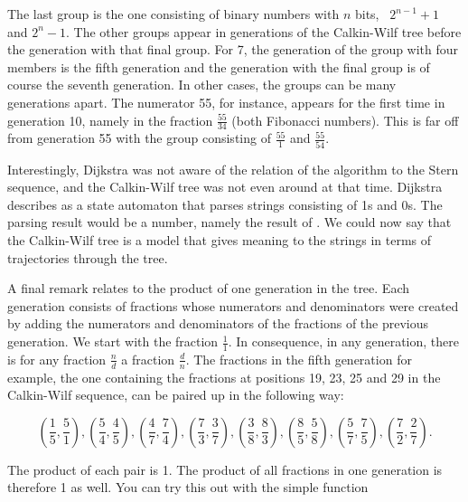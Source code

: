 \documentclass[tikz]{scrreprt}
\newcommand{\texfamily}{\fontfamily{cmtex}\selectfont}
\begin{document}

The last group is the one consisting of
binary numbers with $n$ bits, \ie\ $2^{n-1}+1$ and $2^n-1$.
The other groups appear in generations of the Calkin-Wilf tree
before the generation with that final group.
For 7, the generation of the group
with four members is the fifth generation and
the generation with the final group is of course the seventh generation.
In other cases,
the groups can be many generations apart.
The numerator 55, for instance, appears for the first time
in generation 10, namely in the fraction $\frac{55}{34}$
(both Fibonacci numbers).
This is far off from generation 55 
with the group consisting of $\frac{55}{1}$ and $\frac{55}{54}$.

Interestingly, Dijkstra was not aware of the relation
of the \text{\texfamily fusc} algorithm to the Stern sequence, and
the Calkin-Wilf tree was not even around at that time.
Dijkstra describes \text{\texfamily fusc} as a state automaton that
parses strings consisting of 1s and 0s.
The parsing result would be a number, 
namely the result of \text{\texfamily fusc}.
We could now say that the Calkin-Wilf tree
is a model that gives meaning to the strings
in terms of trajectories through the tree.

A final remark relates to the product of one generation in the tree.
Each generation consists of fractions 
whose numerators and denominators were created
by adding the numerators and denominators 
of the fractions of the previous generation.
We start with the fraction $\frac{1}{1}$.
In consequence, in any generation, 
there is for any fraction $\frac{n}{d}$ 
a fraction $\frac{d}{n}$.
The fractions in the fifth generation for example,
the one containing the fractions 
at positions 19, 23, 25 and 29 in the Calkin-Wilf sequence,
can be paired up in the following way:

\[
\left(\frac{1}{5}, \frac{5}{1}\right),
\left(\frac{5}{4}, \frac{4}{5}\right),
\left(\frac{4}{7}, \frac{7}{4}\right),
\left(\frac{7}{3}, \frac{3}{7}\right),
\left(\frac{3}{8}, \frac{8}{3}\right),
\left(\frac{8}{5}, \frac{5}{8}\right),
\left(\frac{5}{7}, \frac{7}{5}\right),
\left(\frac{7}{2}, \frac{2}{7}\right).
\]

The product of each pair is 1.
The product of all fractions 
in one generation is therefore 1 as well.
You can try this out with
the simple function 
\end{document}
